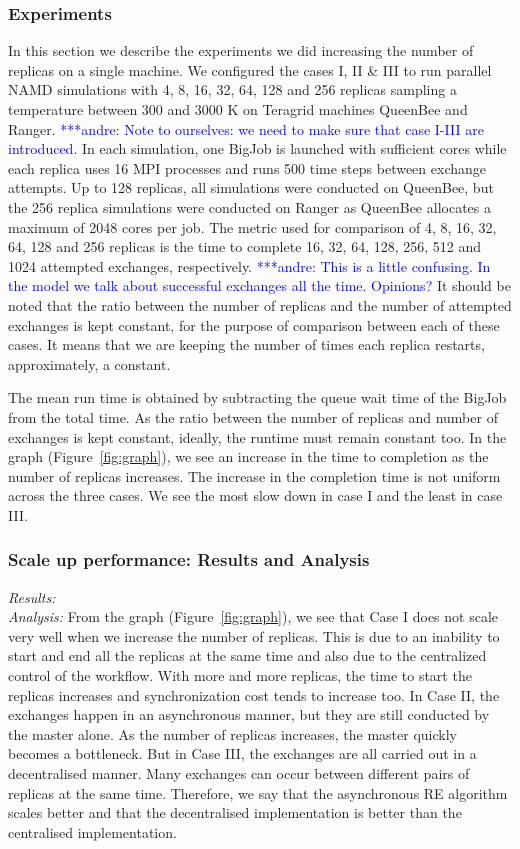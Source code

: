 \documentclass{rspublic}
\newcommand{\alnote}[1]{ {\textcolor{blue} { ***andre: #1 }}}
\newcommand{\alnote}[1]{}
\begin{document}
\subsubsection{Experiments}
In this section we describe the experiments we did increasing the
number of replicas on a single machine. We configured the cases I, II
\& III to run parallel NAMD simulations with 4, 8, 16, 32, 64, 128 and
256 replicas sampling a temperature between 300 and 3000 K on Teragrid
machines QueenBee and Ranger. \alnote{Note to ourselves: we need to make sure that
case I-III are introduced.} In each
simulation, one BigJob is launched with sufficient cores while each
replica uses 16 MPI processes and runs 500 time steps between exchange
attempts. Up to 128 replicas, all simulations were conducted on
QueenBee, but the 256 replica simulations were conducted on Ranger as
QueenBee allocates a maximum of 2048 cores per job. The metric used
for comparison of 4, 8, 16, 32, 64, 128 and 256 replicas is the time
to complete 16, 32, 64, 128, 256, 512 and 1024 attempted exchanges,
respectively. \alnote{This is a little confusing. In the model we talk
about successful exchanges all the time. Opinions?} 
It should be noted that the ratio between the number of
replicas and the number of attempted exchanges is kept constant, for
the purpose of comparison between each of these cases. It means that
we are keeping the number of times each replica restarts,
approximately, a constant.

The mean run time is obtained by subtracting the queue wait time of
the BigJob from the total time. As the ratio between the number of
replicas and number of exchanges is kept constant, ideally, the
runtime must remain constant too. In the graph
(Figure~\ref{fig:graph}), we see an increase in the time to completion
as the number of replicas increases. The increase in the completion
time is not uniform across the three cases. We see the most slow down
in case I and the least in case III.

\subsubsection{Scale up performance: Results and Analysis}

{\it Results:}\\

{\it Analysis: } From the graph (Figure~\ref{fig:graph}), we see that
Case I does not scale very well when we increase the number of
replicas. This is due to an inability to start and end all the
replicas at the same time and also due to the centralized control of 
the workflow. With more and more replicas, the time to start the replicas increases  and 
synchronization cost tends to increase too.  In Case II, the exchanges happen in
an asynchronous manner, but they are still conducted by the master
alone. As the number of replicas increases, the master quickly becomes
a bottleneck. But in Case III, the exchanges are all carried out in a
decentralised manner. Many exchanges can occur between different pairs
of replicas at the same time. Therefore, we say that the asynchronous
RE algorithm scales better and that the decentralised implementation
is better than the centralised implementation.
\end{document}
